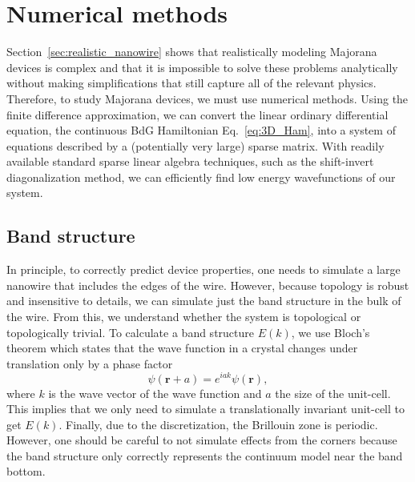 \section{Numerical methods}\label{sec:numerical_methods}
Section~\ref{sec:realistic_nanowire} shows that realistically modeling Majorana devices is complex and that it is impossible to solve these problems analytically without making simplifications that still capture all of the relevant physics.
Therefore, to study Majorana devices, we must use numerical methods.
Using the finite difference approximation, we can convert the linear ordinary differential equation, the continuous BdG Hamiltonian Eq.~\eqref{eq:3D_Ham}, into a system of equations described by a (potentially very large) sparse matrix.
With readily available standard sparse linear algebra techniques, such as the shift-invert diagonalization method, we can efficiently find low energy wavefunctions of our system.

\subsection{Band structure}\label{sec:band_structure_numerics}
In principle, to correctly predict device properties, one needs to simulate a large nanowire that includes the edges of the wire.
However, because topology is robust and insensitive to details, we can simulate just the band structure in the bulk of the wire.
From this, we understand whether the system is topological or topologically trivial.
To calculate a band structure $E(k)$, we use Bloch's theorem which states that the wave function in a crystal changes under translation only by a phase factor
\begin{equation}
\psi(\bm{r}+a) = e^{i a k}\psi(\bm{r}),
\end{equation}
where $k$ is the wave vector of the wave function and $a$ the size of the unit-cell.
This implies that we only need to simulate a translationally invariant unit-cell to get $E(k)$.
Finally, due to the discretization, the Brillouin zone is periodic.
However, one should be careful to not simulate effects from the corners because the band structure only correctly represents the continuum model near the band bottom.

